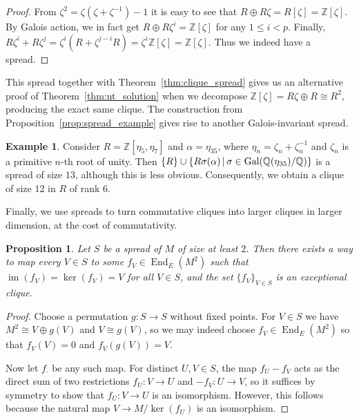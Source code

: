 \documentclass{amsart}
\theoremstyle{plain}
\newtheorem{proposition}[theorem]{Proposition}
\theoremstyle{definition}
\newtheorem{example}[theorem]{Example}
\DeclareMathOperator{\End}{End}
\DeclareMathOperator{\im}{im}
\newcommand{\Z}{\ensuremath{\mathbb{Z}}}
\newcommand{\Q}{\ensuremath{\mathbb{Q}}}
\newcommand{\nrg}{R}
\begin{document}

\begin{proof}
	From $\zeta^2=\zeta(\zeta+\zeta^{-1})-1$ it is easy to see that $\nrg\oplus  \nrg \zeta =\nrg[\zeta]=\Z[\zeta]$. 
	By Galois action, we in fact get $\nrg\oplus \nrg\zeta^i=\Z[\zeta]$ for any $1\le i < p$. 
	Finally, $\nrg \zeta^i+\nrg\zeta^j=\zeta^i(\nrg+\zeta^{j-i}\nrg)=\zeta^i\Z[\zeta]=\Z[\zeta]$. 
	Thus we indeed have a spread.
\end{proof}


This spread together with Theorem~\ref{thm:clique_spread} gives us an alternative proof of Theorem~\ref{thm:nt_solution} when we decompose \(\Z[\zeta]=R\zeta \oplus R \cong R^2\), producing the exact same clique.
The construction from Proposition~\ref{prop:spread_example} gives rise to another Galois-invariant spread.

\begin{example}
	Consider $R=\Z[\eta_5,\eta_7]$ and $\alpha=\eta_{35}$, where $\eta_n=\zeta_n+\zeta_n^{-1}$ and \(\zeta_n\) is a primitive \(n\)-th root of unity. Then \(\{R\}\cup \{R\sigma(\alpha)\,|\, \sigma \in \textup{Gal}(\Q(\eta_{35})/\Q)\}\) is a spread of size \(13\), although this is less obvious. Consequently, we obtain a clique of size \(12\) in \(R\) of rank \(6\). 
\end{example}

Finally, we use spreads to turn commutative cliques into larger cliques in larger dimension, at the cost of commutativity.

\begin{proposition}\label{prop:spread_projections}
	Let \(S\) be a spread of \(M\) of size at least \(2\). Then there exists a way to map every $V\in S$ to some $f_V\in\End_E(M^2)$ such that \(\im(f_V)=\ker(f_V)=V\) for all \(V\in S\), and the set $\{f_V\}_{V\in S}$ is an exceptional clique.
\end{proposition}
\begin{proof}
	Choose a permutation \(g:S\to S\) without fixed points.
	For \(V\in S\) we have \(M^2\cong V\oplus g(V)\) and \(V\cong g(V)\), so we may indeed choose \(f_V\in\End_E(M^2)\) so that \(f_V(V)=0\) and \(f_V(g(V))=V\).
	
	Now let \(f_\cdot\) be any such map. For distinct \(U,V\in S\), the map \(f_U-f_V\) acts as the direct sum of two restrictions \(f_U:V\to U\) and \(-f_V:U\to V\), so it suffices by symmetry to show that \(f_U:V\to U\) is an isomorphism. However, this follows because the natural map \(V\to M/\ker(f_U)\) is an isomorphism.
\end{proof}
\end{document}

